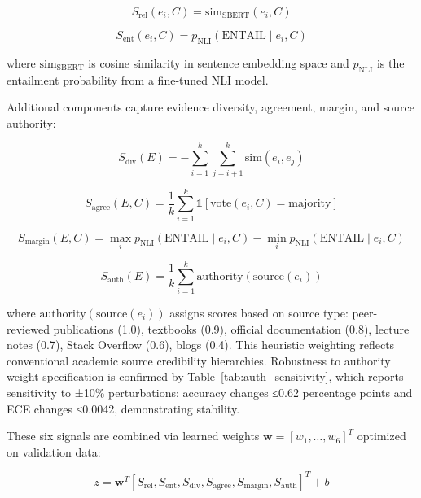 \documentclass[journal]{IEEEtran}
\begin{document}
\begin{equation}
S_{\text{rel}}(e_i, C) = \text{sim}_{\text{SBERT}}(e_i, C)
\end{equation}

\begin{equation}
S_{\text{ent}}(e_i, C) = p_{\text{NLI}}(\text{ENTAIL} \mid e_i, C)
\end{equation}

where $\text{sim}_{\text{SBERT}}$ is cosine similarity in sentence embedding space and $p_{\text{NLI}}$ is the entailment probability from a fine-tuned NLI model.

Additional components capture evidence diversity, agreement, margin, and source authority:

\begin{equation}
S_{\text{div}}(E) = -\sum_{i=1}^{k} \sum_{j=i+1}^{k} \text{sim}(e_i, e_j)
\end{equation}

\begin{equation}
S_{\text{agree}}(E, C) = \frac{1}{k} \sum_{i=1}^{k} \mathbb{1}[\text{vote}(e_i, C) = \text{majority}]
\end{equation}

\begin{equation}
S_{\text{margin}}(E, C) = \max_i p_{\text{NLI}}(\text{ENTAIL} \mid e_i, C) - \min_i p_{\text{NLI}}(\text{ENTAIL} \mid e_i, C)
\end{equation}

\begin{equation}
S_{\text{auth}}(E) = \frac{1}{k} \sum_{i=1}^{k} \text{authority}(\text{source}(e_i))
\end{equation}

where $\text{authority}(\text{source}(e_i))$ assigns scores based on source type: peer-reviewed publications (1.0), textbooks (0.9), official documentation (0.8), lecture notes (0.7), Stack Overflow (0.6), blogs (0.4). This heuristic weighting reflects conventional academic source credibility hierarchies. Robustness to authority weight specification is confirmed by Table~\ref{tab:auth_sensitivity}, which reports sensitivity to ±10\% perturbations: accuracy changes ≤0.62 percentage points and ECE changes ≤0.0042, demonstrating stability.

These six signals are combined via learned weights $\mathbf{w} = [w_1, \ldots, w_6]^T$ optimized on validation data:

\begin{equation}
z = \mathbf{w}^T [S_{\text{rel}}, S_{\text{ent}}, S_{\text{div}}, S_{\text{agree}}, S_{\text{margin}}, S_{\text{auth}}]^T + b
\end{equation}
\end{document}

